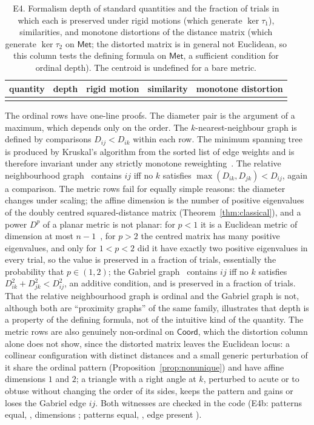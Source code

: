 \documentclass[11pt,a4paper]{article}
\theoremstyle{plain}
\theoremstyle{definition}
\theoremstyle{remark}
\newcommand{\Fcoord}{\mathsf{Coord}}
\newcommand{\Fmet}{\mathsf{Met}}
\begin{document}
\begin{table}[t]
\centering\small
\begin{tabular}{lcccc}
\toprule
quantity & depth & rigid motion & similarity & monotone distortion\\
\midrule
\\
\bottomrule
\end{tabular}
\caption{E4. Formalism depth of standard quantities and the fraction of \EfourTrials{} trials in which each is preserved under rigid motions (which generate $\ker\tau_1$), similarities, and monotone distortions of the distance matrix (which generate $\ker\tau_2$ on $\Fmet$; the distorted matrix is in general not Euclidean, so this column tests the defining formula on $\Fmet$, a sufficient condition for ordinal depth). The centroid is undefined for a bare metric.}
\label{tab:e4}
\end{table}

The ordinal rows have one-line proofs. The diameter pair is the argument of a maximum, which depends only on the order. The $k$-nearest-neighbour graph is defined by comparisons $D_{ij}<D_{ik}$ within each row. The minimum spanning tree is produced by Kruskal's algorithm from the sorted list of edge weights and is therefore invariant under any strictly monotone reweighting~\citep{kruskal1956}. The relative neighbourhood graph~\citep{toussaint1980} contains $ij$ iff no $k$ satisfies $\max(D_{ik},D_{jk})<D_{ij}$, again a comparison. The metric rows fail for equally simple reasons: the diameter changes under scaling; the affine dimension is the number of positive eigenvalues of the doubly centred squared-distance matrix (Theorem~\ref{thm:classical}), and a power $D^p$ of a planar metric is not planar: for $p<1$ it is a Euclidean metric of dimension at most $n-1$~\citep{schoenberg1937}, for $p>2$ the centred matrix has many positive eigenvalues, and only for $1<p<2$ did it have exactly two positive eigenvalues in every trial, so the value is preserved in a fraction \EfourAffMono{} of trials, essentially the probability that $p\in(1,2)$; the Gabriel graph~\citep{gabriel1969} contains $ij$ iff no $k$ satisfies $D_{ik}^2+D_{jk}^2<D_{ij}^2$, an additive condition, and is preserved in a fraction \EfourGabrielMono{} of trials. That the relative neighbourhood graph is ordinal and the Gabriel graph is not, although both are ``proximity graphs'' of the same family, illustrates that depth is a property of the defining formula, not of the intuitive kind of the quantity. The metric rows are also genuinely non-ordinal on $\Fcoord$, which the distortion column alone does not show, since the distorted matrix leaves the Euclidean locus: a collinear configuration with distinct distances and a small generic perturbation of it share the ordinal pattern (Proposition~\ref{prop:nonunique}) and have affine dimensions $1$ and $2$; a triangle with a right angle at $k$, perturbed to acute or to obtuse without changing the order of its sides, keeps the pattern and gains or loses the Gabriel edge $ij$. Both witnesses are checked in the code (E4b: patterns equal, \EfourbCollinearSame, dimensions \EfourbCollinearDims; patterns equal, \EfourbGabrielSame, edge present \EfourbGabrielEdges).
\end{document}
